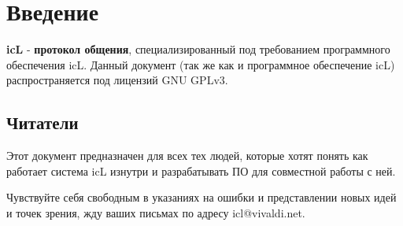 \section{Введение}

\textbf{icL} - \textbf{протокол общения}, специализированный под требованием программного обеспечения icL. Данный документ (так же как и программное обеспечение icL) распространяется под лицензий GNU GPLv3.

\subsection{Читатели}

Этот документ предназначен для всех тех людей, которые хотят понять как работает система icL изнутри и разрабатывать ПО для совместной работы с ней.

Чувствуйте себя свободным в указаниях на ошибки и представлении новых идей и точек зрения, жду ваших письмах по адресу icl@vivaldi.net.
